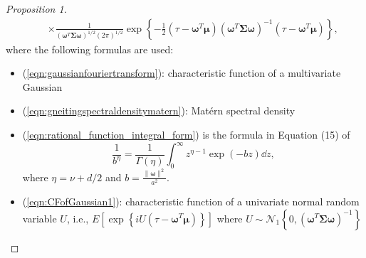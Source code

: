 \documentclass[12pt]{article}
\newcommand{\0}{\mathbf{0}}
\newtheorem{proof}{Proof}
\begin{document}
\begin{proof}[Proposition 1]
\begin{eqnarray}
&& \times \frac{1}{(\boldsymbol{\omega}^T\boldsymbol{\Sigma}\boldsymbol{\omega})^{1/2}(2\pi)^{1/2}} \exp\left\{-\frac{1}{2}(\tau-\boldsymbol{\omega}^T\boldsymbol{\mu})(\boldsymbol{\omega}^T\boldsymbol{\Sigma}\boldsymbol{\omega})^{-1}(\tau-\boldsymbol{\omega}^T\boldsymbol{\mu})\right\} , \nonumber 
\end{eqnarray}
where the following formulas are used:
\begin{itemize}
\item (\ref{eqn:gaussianfouriertransform}): characteristic function of a multivariate Gaussian
\item (\ref{eqn:gneitingspectraldensitymatern}): Mat\'{e}rn spectral density
\item (\ref{eqn:rational_function_integral_form}) is the formula in Equation (15) of \citet{chetalova2015portfolio}
\begin{equation*}
\frac{1}{b^{\eta}}=\frac{1}{\Gamma(\eta)}\int_{0}^{\infty}z^{\eta-1}\exp\left(-bz\right)\dd z,
\end{equation*} 
where $\eta=\nu+d/2$ and $b=\frac{ \|\boldsymbol{\omega}\|^2}{a^2}$.
\item (\ref{eqn:CFofGaussian1}): characteristic function of a univariate normal random variable $U$, i.e., $E\left[\exp\left\{iU(\tau-\boldsymbol{\omega}^T\boldsymbol{\mu})\right\}\right]$ where $U\sim \mathcal{N}_1\left\{0, (\boldsymbol{\omega}^T\boldsymbol{\Sigma}\boldsymbol{\omega})^{-1}\right\}$
\end{itemize}


\end{proof}
\end{document}
